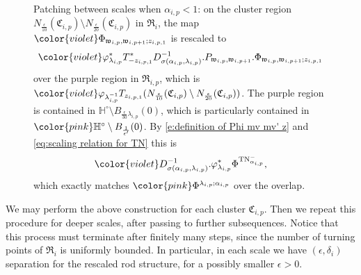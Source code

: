 \documentclass[a4paper,11pt]{amsart}
\theoremstyle{definition}
\numberwithin{equation}{section}
\newcommand{\mw} {\mathfrak w}
\newcommand{\mR} {\mathfrak R}
\newcommand{\mC} {\mathfrak C}
\DeclareMathOperator{\TN}{TN}
\begin{document}
\begin{figure}[ht]
	\caption{\small Patching between scales when $\alpha_{i,p}<1$: on the cluster region $N_{\frac{\epsilon}{10}}(\mC_{i,p})\setminus N_{\frac{\epsilon}{20}}(\mC_{i,p})$ in $\mR_i$, the map ${\color{violet} \Phi_{\mw_{i,p},\mw_{i,p+1};z_{i,p,1}}}$ is rescaled to 
    $${\color{violet} \varphi_{\lambda_{i, p}}^*T^*_{-z_{i,p,1}}D_{\sigma(\alpha_{i, p},\lambda_{i, p})}^{-1}. P_{\mathfrak{w}_{i,p},\mathfrak{w}_{i,p+1}}.\Phi_{\mw_{i,p},\mw_{i,p+1};z_{i,p,1}}}$$
    over the purple region in $\mR_{i, p}$, which is $\color{violet} \varphi_{\lambda_{i,p}^{-1}}T_{z_{i,p,1}}(N_{\frac{\epsilon}{10}}(\mC_{i,p})\setminus N_{\frac{\epsilon}{20}}(\mC_{i,p}))$. The purple region is contained in $\mathbb{H}^\circ\setminus B_{\frac{\epsilon}{30}\lambda_{i,p}}(0)$, which is particularly contained in ${\color{pink}\mathbb{H}^\circ\setminus B_{\frac{1}{\epsilon'}}(0)}$.
    By \eqref{e:definition of Phi mv mv' z} and \eqref{eq:scaling relation for TN} this is 
    $${\color{violet}D_{\sigma(\alpha_{i, p},\lambda_{i, p})}^{-1}.\varphi_{\lambda_{i, p}}^*\Phi^{\TN^-_{\alpha_{i, p}}}},$$
    which exactly matches $\color{pink} \Phi^{\lambda_{i, p};\alpha_{i, p}}$ over the overlap.}
	\label{Figure:patching clusters}   
\end{figure}




We may perform the above construction for each cluster $\mC_{i, p}$. Then we repeat this procedure for deeper scales, after passing to further subsequences.   Notice that this process must terminate after finitely many steps, since the number of turning points of $\mR_i$ is uniformly bounded. In particular, in each scale we have $(\epsilon, \delta_i)$ separation for the rescaled rod structure, for a possibly smaller $\epsilon>0$.
 
\end{document}
